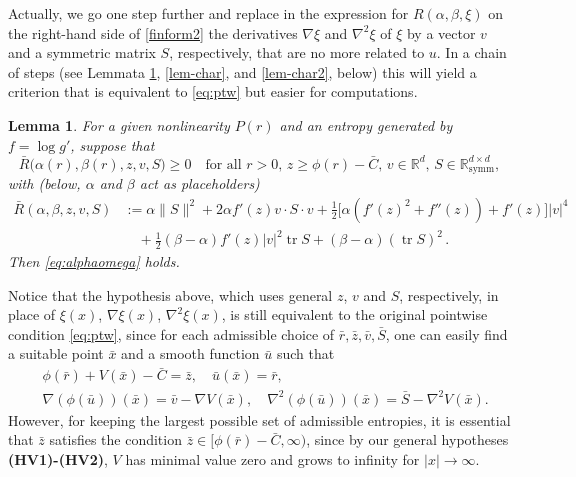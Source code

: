 \documentclass[reqno]{amsart}
\newtheorem{lemma}{Lemma}[section]
\newcommand{\tr}{\operatorname{tr}}
\newcommand{\R}{\mathbb{R}}
\newcommand{\be}{\begin{equation}}
\newcommand{\ee}{\end{equation}}
\begin{document}
Actually, we go one step further and replace in the expression for $R(\alpha,\beta,\xi)$ on the right-hand side of \eqref{finform2}
the derivatives $\nabla\xi$ and $\nabla^2\xi$ of $\xi$ by a vector $v$ and a symmetric matrix $S$, respectively,
that are no more related to $u$.
In a chain of steps (see Lemmata \ref{prop4.5}, \ref{lem-char}, and \ref{lem-char2}, below) this will yield a criterion that is equivalent to \eqref{eq:ptw} but easier for computations. 
%
\begin{lemma}\label{prop4.5}
  For a given nonlinearity $P(r)$ and an entropy generated by $f=\log g'$, suppose that
  \be\label{rem-cond}
  \bar R\big(\alpha(r),\beta(r),z,v,S\big)\ge0\quad \text{for all 
  $r>0$, $z\ge\phi(r)-\bar C$, $v\in\R^d$, $S\in\R^{d\times d}_\text{symm}$},
  \ee
  with (below, $\alpha$ and $\beta$ act as placeholders) 
  \begin{align}
    \bar R(\alpha,\beta,z,v,S) 
    &:=  \alpha \|S\|^2 
      + 2 \alpha f'(z)v\cdot S \cdot v 
      + \frac12 \big[\alpha (f'(z)^2+f''(z))+f'(z)\big]|v|^4 \nonumber\\
    &\quad+ \frac12 (\beta-\alpha)f'(z)|v|^2\tr S 
      + (\beta-\alpha)(\tr S)^2\,.
      \label{finform2b}
  \end{align}
  Then \eqref{eq:alphaomega} holds.
\end{lemma}
%
Notice that the hypothesis above, which uses general $z$, $v$ and $S$, respectively, in place of $\xi(x)$, $\nabla\xi(x)$, $\nabla^2\xi(x)$,
is still equivalent to the original pointwise condition \eqref{eq:ptw},
since for each admissible choice of $\bar r,\bar z,\bar v,\bar S$,
one can easily find a suitable point $\bar x$ and a smooth function $\bar u$ such that 
\begin{align*}
  &\phi(\bar r) + V(\bar x) -\bar C = \bar z, \quad
  \bar u(\bar x) = \bar r,\\
  &\nabla (\phi(\bar u)) (\bar x) = \bar v -\nabla V (\bar x),\quad
  \nabla^2 (\phi(\bar u)) (\bar x) = \bar S -  \nabla^2 V (\bar x).
\end{align*}
However, for keeping the largest possible set of admissible entropies, it is essential that $\bar z$ satisfies the condition $\bar z\in[\phi(\bar r)-\bar C,\infty)$, since by our general hypotheses {\bf (HV1)-(HV2)}, $V$ has minimal value zero and grows to infinity for $|x|\to\infty$.
\end{document}
